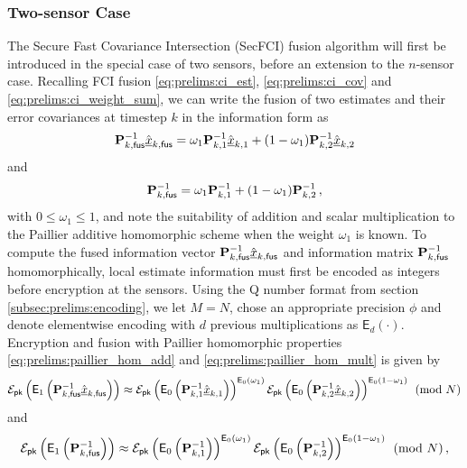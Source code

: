 \subsubsection{Two-sensor Case}\label{subsubsec:cloud_fusion:secfci_2_sen}
The Secure Fast Covariance Intersection (SecFCI) fusion algorithm will first be introduced in the special case of two sensors, before an extension to the $n$-sensor case. Recalling FCI fusion \eqref{eq:prelims:ci_est}, \eqref{eq:prelims:ci_cov} and \eqref{eq:prelims:ci_weight_sum}, we can write the fusion of two estimates and their error covariances at timestep $k$ in the information form as
\begin{equation}
    {\ensuremath{{\mathbf{P}}}}_{k,\mathsf{fus}}^{-1}\hat{{\underline{x}}}_{k,\mathsf{fus}} = \omega_1{{\mathbf{P}}}_{k,1}^{-1}\hat{{\underline{x}}}_{k,1} + (1 - \omega_1){{\mathbf{P}}}_{k,2}^{-1}\hat{{\underline{x}}}_{k,2}
\end{equation}
and
\begin{equation}
    {\ensuremath{{\mathbf{P}}}}_{k,\mathsf{fus}}^{-1} = \omega_1{{\mathbf{P}}}_{k,1}^{-1} + (1 - \omega_1){{\mathbf{P}}}_{k,2}^{-1}\,,
\end{equation}
with $0\leq \omega_1\leq 1$, and note the suitability of addition and scalar multiplication to the Paillier additive homomorphic scheme when the weight $\omega_1$ is known. To compute the fused information vector ${{\mathbf{P}}}_{k,\mathsf{fus}}^{-1}\hat{{\underline{x}}}_{k,\mathsf{fus}}$ and information matrix ${{\mathbf{P}}}_{k,\mathsf{fus}}^{-1}$ homomorphically, local estimate information must first be encoded as integers before encryption at the sensors. Using the Q number format from section \ref{subsec:prelims:encoding}, we let $M=N$, chose an appropriate precision $\phi$ and denote elementwise encoding with $d$ previous multiplications as $\mathsf{E}_d(\cdot)$. Encryption and fusion with Paillier homomorphic properties \eqref{eq:prelims:paillier_hom_add} and \eqref{eq:prelims:paillier_hom_mult} is given by
\begin{equation}\label{eq:cloud_fusion:secfci_2sen_paillier_fuse_ests}
    \mathcal{E}_{\mathsf{pk}}\left(\mathsf{E}_1\left({{\mathbf{P}}}_{k,\mathsf{fus}}^{-1}\hat{{\underline{x}}}_{k,\mathsf{fus}}\right)\right) \approx \mathcal{E}_{\mathsf{pk}}\left(\mathsf{E}_0\left({{\mathbf{P}}}^{-1}_{k,1}\hat{{\underline{x}}}_{k,1}\right)\right)^{\mathsf{E}_0(\omega_1)}\mathcal{E}_{\mathsf{pk}}\left(\mathsf{E}_0\left({{\mathbf{P}}}^{-1}_{k,2}\hat{{\underline{x}}}_{k,2}\right)\right)^{\mathsf{E}_0(1 - \omega_1)}\pmod{N}
\end{equation}
and
\begin{equation}\label{eq:cloud_fusion:secfci_2sen_paillier_fuse_covs}
    \mathcal{E}_{\mathsf{pk}}\left(\mathsf{E}_1\left({{\mathbf{P}}}_{k,\mathsf{fus}}^{-1}\right)\right) \approx \mathcal{E}_{\mathsf{pk}}\left(\mathsf{E}_0\left({{\mathbf{P}}}^{-1}_{k,1}\right)\right)^{\mathsf{E}_0(\omega_1)}\mathcal{E}_{\mathsf{pk}}\left(\mathsf{E}_0\left({{\mathbf{P}}}^{-1}_{k,2}\right)\right)^{\mathsf{E}_0(1 -\omega_1)}\pmod{N}\,,
\end{equation}
